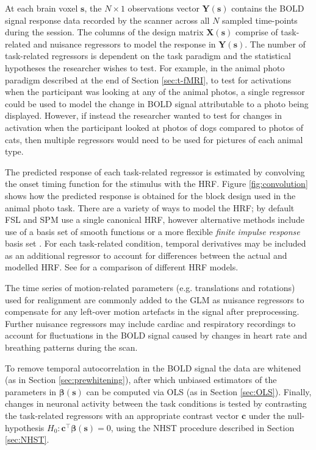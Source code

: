 At each brain voxel $\bm{s}$, the $N \times 1$ observations vector $\bm{Y}(\bm{s})$ contains the BOLD signal response data recorded by the scanner across all $N$ sampled time-points during the session. The columns of the design matrix $\bm{X}(\bm{s})$  comprise of task-related and nuisance regressors to model the response in $\bm{Y}(\bm{s})$. The number of task-related regressors is dependent on the task paradigm and the statistical hypotheses the researcher wishes to test. For example, in the animal photo paradigm described at the end of Section \ref{sec:t-fMRI}, to test for activations when the participant was looking at any of the animal photos, a single regressor could be used to model the change in BOLD signal attributable to a photo being displayed. However, if instead the researcher wanted to test for changes in activation when the participant looked at photos of dogs compared to photos of cats, then multiple regressors would need to be used for pictures of each animal type. 

The predicted response of each task-related regressor is estimated by convolving the onset timing function for the stimulus with the HRF. Figure \ref{fig:convolution} shows how the predicted response is obtained for the block design used in the animal photo task. There are a variety of ways to model the HRF; by default FSL and SPM use a single canonical HRF, however alternative methods include use of a basis set of smooth functions \citep{Friston1998-jl} or a more flexible \textit{finite impulse response} basis set \citep{Goutte2000-vd}. For each task-related condition, temporal derivatives may be included as an additional regressor to account for differences between the actual and modelled HRF. See \citet{Lindquist2009-fs} for a comparison of different HRF models.

The time series of motion-related parameters (e.g. translations and rotations) used for realignment are commonly added to the GLM as nuisance regressors to compensate for any left-over motion artefacts in the signal after preprocessing. Further nuisance regressors may include cardiac and respiratory recordings to account for fluctuations in the BOLD signal caused by changes in heart rate and breathing patterns during the scan. 

To remove temporal autocorrelation in the BOLD signal the data are whitened (as in Section \ref{sec:prewhitening}), after which unbiased estimators of the parameters in $\bm{\beta}(\bm{s})$ can be computed via OLS (as in Section \ref{sec:OLS}). Finally, changes in neuronal activity between the task conditions is tested by contrasting the task-related regressors with an appropriate contrast vector $\bm{c}$ under the null-hypothesis $H_{0} : \bm{c}^{\intercal}\bm{\beta}(\bm{s}) = 0$, using the NHST procedure described in Section \ref{sec:NHST}.  

